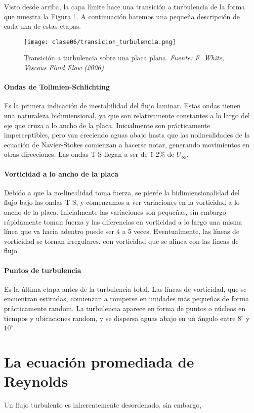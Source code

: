 Visto desde arriba, la capa límite hace una transición a turbulencia de la forma que muestra la Figura \ref{fig:transicion_turbulencia}.
A continuación haremos una pequeña descripción de cada una de estas etapas.
%
\begin{figure}[h!]
\centering
\texttt{[image: clase06/transicion\_turbulencia.png]}
\caption{Transición a turbulencia sobre una placa plana. \emph{Fuente: F. White, Viscous Fluid Flow (2006)}}
\label{fig:transicion_turbulencia}
\end{figure}

\paragraph*{Ondas de Tollmien-Schlichting}
Es la primera indicación de inestabilidad del flujo laminar. 
Estas ondas tienen una naturaleza bidimiensional, ya que son relativamente constantes a lo largo del eje que cruza a lo ancho de la placa.
Inicialmente son prácticamente imperceptibles, pero van creciendo aguas abajo hasta que las nolinealidades de la ecuación de Navier-Stokes comienzan a hacerse notar, generando movimientos en otras direcciones.
Las ondas T-S llegan a ser de \~1-2\% de $U_\infty$.

\paragraph*{Vorticidad a lo ancho de la placa}
Debido a que la no-linealidad toma fuerza, se pierde la bidimiensionalidad del flujo bajo las ondas T-S, y comenzamos a ver variaciones en la vorticidad a lo ancho de la placa.
Inicialmente las variaciones son pequeñas, sin embargo rápidamente toman fuerza y las diferencias en vorticidad a lo largo una misma línea que va hacia adentro puede ser 4 a 5 veces.
Eventualmente, las líneas de vorticidad se tornan irregulares, con vorticidad que se alinea con las líneas de flujo.

\paragraph*{Puntos de turbulencia}
Es la última etapa antes de la turbulencia total.
Las líneas de vorticidad, que se encuentran estiradas, comienzan a romperse en unidades más pequeñas de forma prácticamente random. 
La turbulencia aparece en forma de puntos o núcleos en tiempos y ubicaciones random, y se dispersa aguas abajo en un ángulo entre $8^\circ$ y $10^\circ$.

\section*{La ecuación promediada de Reynolds}

Un flujo turbulento es inherentemente desordenado, sin embargo, 
